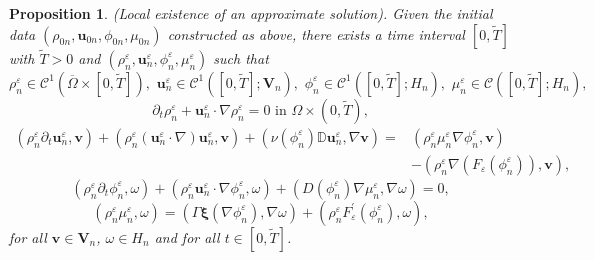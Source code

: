 \documentclass[11pt]{article}
\def\bq{\begin{equation}}
\def\eq{\end{equation}}
\def\bfV{\mathbf{V}}
\def\bfv{\mathbf{v}}
\def\bfu{\mathbf{u}}
\def\bfxi{\boldsymbol{\xi}}
\def\bq{\begin{equation}}
\def\eq{\end{equation}}
\def\Ga{\Gamma}
\newtheorem{proposition}[theorem]{Proposition}
\begin{document}
\begin{proposition}{(Local existence of an approximate solution)}. Given the initial data $(\rho_{0n},\bfu_{0n},\phi_{0n},\mu_{0n})$ constructed as above, there exists a time interval $[0,\widetilde{T}]$ with $\widetilde{T} > 0$ and $(\rho_n^{\varepsilon},\bfu_n^{\varepsilon},\phi_n^{\varepsilon},\mu_n^{\varepsilon})$ such that
\bq
\rho_n^{\varepsilon} \in \mathcal{C}^1(\overline{\Omega}\times[0,\widetilde{T}]),\,\,\bfu_n^{\varepsilon}\in \mathcal{C}^1([0,\widetilde{T}];\bfV_n),\,\, \phi_n^{\varepsilon}\in \mathcal{C}^1([0,\widetilde{T}];H_n), \,\, \mu_n^{\varepsilon}\in \mathcal{C}([0,\widetilde{T}];H_n),
\eq
\bq
\partial_t\rho_n^{\varepsilon} + \bfu_n^{\varepsilon}\cdot\nabla\rho_n^{\varepsilon} = 0 \text{ in } \Omega\times(0,\widetilde{T}),\label{density_T}
\eq
\bq
\begin{aligned}
(\rho_n^{\varepsilon}\partial_t \bfu_n^{\varepsilon},\bfv) + (\rho_n^{\varepsilon}(\bfu_n^{\varepsilon}\cdot\nabla)\bfu_n^{\varepsilon},\bfv) + (\nu(\phi_n^{\varepsilon})\mathbb{D}\bfu_n^{\varepsilon},\nabla\bfv)=& (\rho_n^{\varepsilon}\mu_n^{\varepsilon}\nabla\phi_n^{\varepsilon},\bfv)\\
&-(\rho_n^{\varepsilon}\nabla(F_{\varepsilon}(\phi_n^{\varepsilon})),\bfv),\label{velocity_T}
\end{aligned}
\eq
\bq
(\rho_n^{\varepsilon}\partial_t\phi_n^{\varepsilon},\omega) + (\rho_n^{\varepsilon}\bfu_n^{\varepsilon}\cdot\nabla\phi_n^{\varepsilon},\omega)+ (D(\phi_n^{\varepsilon})\nabla\mu_n^{\varepsilon},\nabla\omega) = 0,\label{concentration_T}
\eq
\bq
(\rho_n^{\varepsilon}\mu_n^{\varepsilon},\omega) =(\Ga\bfxi(\nabla\phi_n^{\varepsilon}),\nabla\omega) + (\rho_n^{\varepsilon} F_{\varepsilon}^{\prime}(\phi_n^{\varepsilon}),\omega),\label{chemical_T}
\eq
for all $\bfv\in \bfV_n$, $\omega\in H_n$ and for all $t\in [0,\widetilde{T}]$.
\end{proposition}
\end{document}

